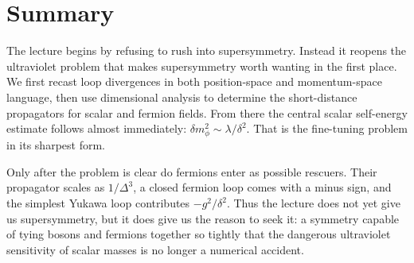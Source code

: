 \section{Summary}

The lecture begins by refusing to rush into supersymmetry. Instead it reopens the ultraviolet problem that makes supersymmetry worth wanting in the first place. We first recast loop divergences in both position-space and momentum-space language, then use dimensional analysis to determine the short-distance propagators for scalar and fermion fields. From there the central scalar self-energy estimate follows almost immediately: \(\delta m_\phi^2\sim \lambda/\delta^2\). That is the fine-tuning problem in its sharpest form.

Only after the problem is clear do fermions enter as possible rescuers. Their propagator scales as \(1/\Delta^3\), a closed fermion loop comes with a minus sign, and the simplest Yukawa loop contributes \(-g^2/\delta^2\). Thus the lecture does not yet give us supersymmetry, but it does give us the reason to seek it: a symmetry capable of tying bosons and fermions together so tightly that the dangerous ultraviolet sensitivity of scalar masses is no longer a numerical accident.